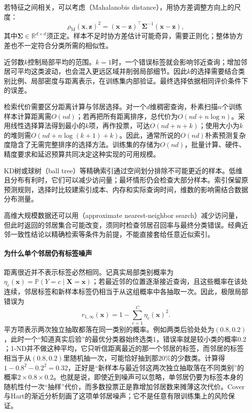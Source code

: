 若特征之间相关，可以考虑（Mahalanobis distance），用协方差调整方向上的尺度：
\begin{equation}
  \rho_{\mathrm{M}}(\bm{x},\bm{z})^2
  =(\bm{x}-\bm{z})^\top
   \bm{\Sigma}^{-1}(\bm{x}-\bm{z}),
  \label{eq:classification-mahalanobis}
\end{equation}
其中$\bm{\Sigma}\in\mathbb{R}^{d\times d}$须正定。样本不足时协方差估计可能奇异，需要正则化；整体协方差也不一定符合分类所需的相似性。

近邻数$k$控制局部平均的范围。$k=1$时，一个错误标签就会影响邻近查询；增加邻居可平均这类波动，也会混入更远区域并削弱局部细节。因此$k$的选择需要结合类别比例、局部密度与距离表示，在训练集内部验证。最终选择依据相同评价条件下的误差。

检索代价需要区分距离计算与邻居选择。对一个$d$维稠密查询，朴素扫描$n$个训练样本计算距离需$O(nd)$；若再把所有距离排序，总代价为$O(nd+n\log n)$。采用线性选择算法得到最小的$k$项，再作投票，可达$O(nd+n+k)$；使用大小为$k$的堆则需$O(nd+n\log(k+1)+k)$。因此，通常所说的$O(nd)$朴素预测复杂度隐含了无需完整排序的选择方法。训练集的存储为$O(nd)$，批量计算、硬件、精度要求和延迟预算共同决定这种实现的可用规模。

KD树或球树（ball tree）等精确索引通过空间划分排除不可能更近的样本。低维且分布有利时，它们可以减少访问量；最坏情形仍会检查大部分样本。索引保留原预测规则，选择时比较建索引成本、内存和实际查询时间，维数的影响需结合数据分布测量。

高维大规模数据还可以用（approximate nearest-neighbor search）减少访问量，但此时返回的邻居集合可能改变，须同时检查邻居召回率与最终分类错误。经典近邻一致性结论以精确检索等条件为前提，不能直接套给任意近似索引。

\paragraph{为什么单个邻居仍有标签噪声}
\label{sec:classification-knn-theory}
距离很近并不表示标签必然相同。记真实局部类别概率为$\eta_c(\bm x)=\mathbb P(Y=c\mid\bm X=\bm x)$；若最近邻的位置逐渐接近查询，且这些概率在该处连续，邻居标签和新样本标签仍相当于从这组概率中各抽取一次。因此，极限局部错误为
\[
  r_{1,\infty}(\bm x)=1-\sum_{c=1}^C\eta_c(\bm x)^2.
\]
平方项表示两次独立抽取都落在同一类别的概率。例如两类后验处处为$(0.8,0.2)$，此时一个“知道真实后验”的最优分类器始终选类1，错误率就是较小类的概率$0.2$；1-ND并不做这种平均，它只听信距离最近的那一个邻居的标签，而邻居的标签相当于从$(0.8,0.2)$里随机抽一次，可能恰好抽到那$20\%$的少数类。计算得$1-0.8^2-0.2^2=0.32$，正好是“新样本与最近邻这两次独立抽取落在不同类别”的概率$2\times0.8\times0.2$。也就是说，即使近到噪声可以忽略，单邻居仍要为标签本身的随机性付一次“抽样”代价，而多数投票正是靠增加邻居数来摊薄这次代价。Cover与Hart的渐近分析刻画了这项单邻居噪声；它不是任意有限训练集上的风险保证。

